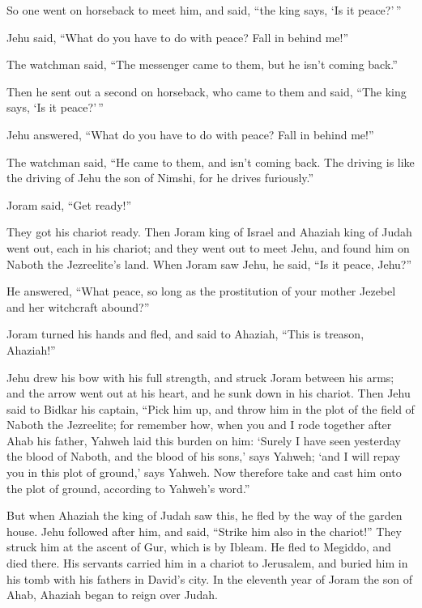  So one went on horseback to meet him, and said, ``the king
says, `Is it peace?'\,''

Jehu said, ``What do you have to do with peace? Fall in behind me!''

The watchman said, ``The messenger came to them, but he isn't coming
back.''

 Then he sent out a second on horseback, who came to them
and said, ``The king says, `Is it peace?'\,''

Jehu answered, ``What do you have to do with peace? Fall in behind me!''

 The watchman said, ``He came to them, and isn't coming
back. The driving is like the driving of Jehu the son of Nimshi, for he
drives furiously.''

 Joram said, ``Get ready!''

They got his chariot ready. Then Joram king of Israel and Ahaziah king
of Judah went out, each in his chariot; and they went out to meet Jehu,
and found him on Naboth the Jezreelite's land.  When Joram
saw Jehu, he said, ``Is it peace, Jehu?''

He answered, ``What peace, so long as the prostitution of your mother
Jezebel and her witchcraft abound?''

 Joram turned his hands and fled, and said to Ahaziah,
``This is treason, Ahaziah!''

 Jehu drew his bow with his full strength, and struck Joram
between his arms; and the arrow went out at his heart, and he sunk down
in his chariot.  Then Jehu said to Bidkar his captain,
``Pick him up, and throw him in the plot of the field of Naboth the
Jezreelite; for remember how, when you and I rode together after Ahab
his father, Yahweh laid this burden on him:  `Surely I have
seen yesterday the blood of Naboth, and the blood of his sons,' says
Yahweh; `and I will repay you in this plot of ground,' says Yahweh. Now
therefore take and cast him onto the plot of ground, according to
Yahweh's word.''

 But when Ahaziah the king of Judah saw this, he fled by
the way of the garden house. Jehu followed after him, and said, ``Strike
him also in the chariot!'' They struck him at the ascent of Gur, which
is by Ibleam. He fled to Megiddo, and died there.  His
servants carried him in a chariot to Jerusalem, and buried him in his
tomb with his fathers in David's city.  In the eleventh
year of Joram the son of Ahab, Ahaziah began to reign over Judah.

